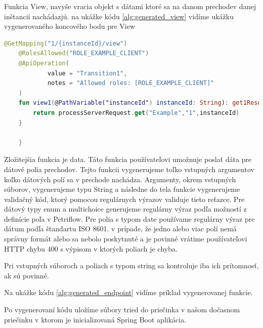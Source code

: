 Funkcia View, navyše vracia objekt s dátami ktoré sa na danom prechodev danej inštancií nachádazjú. na ukážke kódu \ref{alg:generated_view} vidíme ukážku vygenerovaného koncového bodu pre View


\begin{lstlisting}[float, caption={Príklad vygenerovanej funkcie},label={alg:generated_view},language=Kotlin]
	@GetMapping("1/{instanceId}/view")
	@RolesAllowed("ROLE_EXAMPLE_CLIENT")
	@ApiOperation(
			value = "Transition1",
			notes = "Allowed roles: [ROLE_EXAMPLE_CLIENT]"
	)
	fun view1(@PathVariable("instanceId") instanceId: String): get1Result {
		return processServerRequest.get("Example","1",instanceId)
	}
	
	}
\end{lstlisting}




Zložitejšia funkcia je data. Táto funkcia používateľovi umožnuje poslať dáta pre dátové polia prechodov. 
Tejto funkcii vygenerujeme toľko vstupných argumentov koľko dátových polí sa v prechode nachádza. Argumenty, okrem vstupných súborov, vygenerujeme typu String a následne do tela funkcie vygenerujeme validačný kód, ktorý pomocou regulárnych výrazov validuje tieto reťazce. Pre dátový typy enum a multichoice generujeme regulárny výraz podľa možností z definície poľa v Petriflow. Pre polia s typom date používame regulárny výraz pre dátum podľa štandartu ISO 8601. v prípade, že jedno alebo viac polí nemá správny formát alebo sa nebolo poskytnuté a je povinné vrátime používateľovi HTTP chybu 400 s výpisom v ktorých poliach je chyba.

Pri vstupných súboroch a poliach s typom string sa kontroluje iba ich prítomnosť, ak sú povinné.

Na ukážke kódu \ref{alg:generated_endpoint} vidíme príklad vygenerovanej funkcie.

Po vygenerovaní kódu uložíme súbory tried do priečinka v našom dočasnom priečinku v ktorom je inicializovaná Spring Boot aplikácia.  

